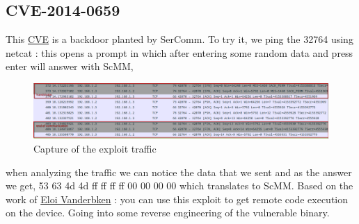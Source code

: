 \documentclass{article}
\begin{document}
\subsection{CVE-2014-0659}
This \href{https://nvd.nist.gov/vuln/detail/CVE-2014-0659}{CVE} is a backdoor planted by SerComm. To try it, we ping the 32764 using netcat : this opens a prompt in which after entering some random data and press enter will answer with ScMM,
\begin{figure}[!ht]
	\centering
	\includegraphics[width=\textwidth]{example.png}
	\caption{Capture of the exploit traffic}
\end{figure}
when analyzing the traffic we can notice the data that we sent and as the answer we get, 53 63 4d 4d ff ff ff ff 00 00 00 00 which translates to ScMM. Based on the work of \href{https://github.com/elvanderb/TCP-32764}{Eloi Vanderbken} : you can use this exploit to get remote code execution on the device. Going into some reverse engineering of the vulnerable binary.
\end{document}
